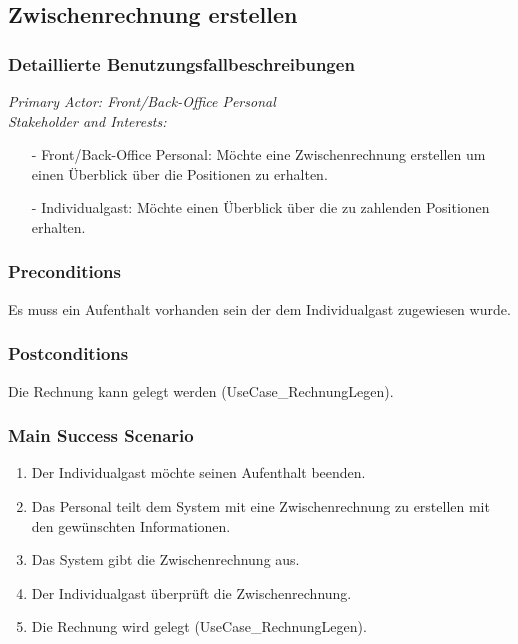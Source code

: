 \documentclass[./detailed_overview_usecases.tex]{subfiles}
\begin{document}
    \subsection{Zwischenrechnung erstellen}
    \subsubsection{Detaillierte Benutzungsfallbeschreibungen}
    \textit{Primary Actor: Front/Back-Office Personal}
    \\
    \textit{Stakeholder and Interests:}
    \begin{itemize}
        \item[-] Front/Back-Office Personal: Möchte eine Zwischenrechnung erstellen um einen Überblick über die Positionen zu erhalten.
        \item[-] Individualgast: Möchte einen Überblick über die zu zahlenden Positionen erhalten.
    \end{itemize}

    \subsubsection*{Preconditions}
    Es muss ein Aufenthalt vorhanden sein der dem Individualgast zugewiesen wurde.

    \subsubsection*{Postconditions}
    Die Rechnung kann gelegt werden (UseCase_RechnungLegen).

    \subsubsection*{Main Success Scenario}
    \begin{enumerate}
        \item Der Individualgast möchte seinen Aufenthalt beenden.
        \item Das Personal teilt dem System mit eine Zwischenrechnung zu erstellen mit den gewünschten Informationen.
        \item Das System gibt die Zwischenrechnung aus.
        \item Der Individualgast überprüft die Zwischenrechnung.
        \item Die Rechnung wird gelegt (UseCase_RechnungLegen).
    \end{enumerate}
\end{document}
